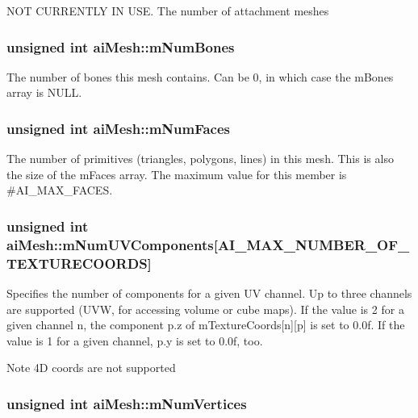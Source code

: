 N\+O\+T C\+U\+R\+R\+E\+N\+T\+L\+Y I\+N U\+S\+E. The number of attachment meshes \hypertarget{structai_mesh_a0f9d5425b6300e32a842a94f943fd79e}{
\subsubsection[{m\+Num\+Bones}]{\setlength{\rightskip}{0pt plus 5cm}unsigned int ai\+Mesh\+::m\+Num\+Bones}}\label{structai_mesh_a0f9d5425b6300e32a842a94f943fd79e}
The number of bones this mesh contains. Can be 0, in which case the m\+Bones array is N\+U\+L\+L. \hypertarget{structai_mesh_aeed22ee6963b79548f3877b3c905518e}{
\subsubsection[{m\+Num\+Faces}]{\setlength{\rightskip}{0pt plus 5cm}unsigned int ai\+Mesh\+::m\+Num\+Faces}}\label{structai_mesh_aeed22ee6963b79548f3877b3c905518e}
The number of primitives (triangles, polygons, lines) in this mesh. This is also the size of the m\+Faces array. The maximum value for this member is \#\+A\+I\+\_\+\+M\+A\+X\+\_\+\+F\+A\+C\+E\+S. \hypertarget{structai_mesh_a635c631a6e66d32989d6b25b2a892d86}{
\subsubsection[{m\+Num\+U\+V\+Components}]{\setlength{\rightskip}{0pt plus 5cm}unsigned int ai\+Mesh\+::m\+Num\+U\+V\+Components\mbox{[}A\+I\+\_\+\+M\+A\+X\+\_\+\+N\+U\+M\+B\+E\+R\+\_\+\+O\+F\+\_\+\+T\+E\+X\+T\+U\+R\+E\+C\+O\+O\+R\+D\+S\mbox{]}}}\label{structai_mesh_a635c631a6e66d32989d6b25b2a892d86}
Specifies the number of components for a given U\+V channel. Up to three channels are supported (U\+V\+W, for accessing volume or cube maps). If the value is 2 for a given channel n, the component p.\+z of m\+Texture\+Coords\mbox{[}n\mbox{]}\mbox{[}p\mbox{]} is set to 0.\+0f. If the value is 1 for a given channel, p.\+y is set to 0.\+0f, too. \begin{DoxyNote}{Note}
4\+D coords are not supported 
\end{DoxyNote}
\hypertarget{structai_mesh_ab34b7b5941e6636f1c08f615cbb072ef}{
\subsubsection[{m\+Num\+Vertices}]{\setlength{\rightskip}{0pt plus 5cm}unsigned int ai\+Mesh\+::m\+Num\+Vertices}}\label{structai_mesh_ab34b7b5941e6636f1c08f615cbb072ef}
